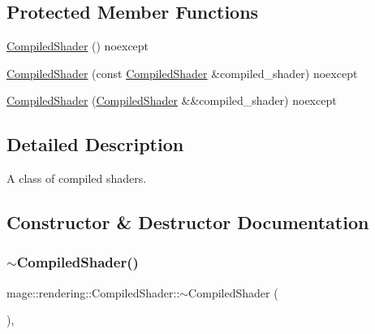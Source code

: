 \subsection*{Protected Member Functions}
\begin{DoxyCompactItemize}
\item 
\mbox{\hyperlink{classmage_1_1rendering_1_1_compiled_shader_a4e62e8d016992f4d7d51297d3796d05d}{Compiled\+Shader}} () noexcept
\item 
\mbox{\hyperlink{classmage_1_1rendering_1_1_compiled_shader_a13ebfdc6d2d9ba554160829a83244e8b}{Compiled\+Shader}} (const \mbox{\hyperlink{classmage_1_1rendering_1_1_compiled_shader}{Compiled\+Shader}} \&compiled\+\_\+shader) noexcept
\item 
\mbox{\hyperlink{classmage_1_1rendering_1_1_compiled_shader_a20a7e1e0b2e9bf378aeda9bf8e429c43}{Compiled\+Shader}} (\mbox{\hyperlink{classmage_1_1rendering_1_1_compiled_shader}{Compiled\+Shader}} \&\&compiled\+\_\+shader) noexcept
\end{DoxyCompactItemize}


\subsection{Detailed Description}
A class of compiled shaders. 

\subsection{Constructor \& Destructor Documentation}
\mbox{\label{classmage_1_1rendering_1_1_compiled_shader_abb17672237a99552beef603cd1d4f680}} 
\subsubsection{\texorpdfstring{$\sim$\+Compiled\+Shader()}{~CompiledShader()}}
{\footnotesize\ttfamily mage\+::rendering\+::\+Compiled\+Shader\+::$\sim$\+Compiled\+Shader (\begin{DoxyParamCaption}{ }\end{DoxyParamCaption})\hspace{0.3cm}{\ttfamily [virtual]}, {\ttfamily [default]}}

